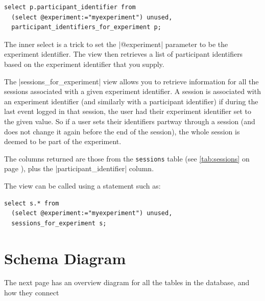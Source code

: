 \documentclass{report}
\newcommand{\myref}[1]{\autoref{#1} on page \pageref*{#1}}
\newcommand{\tabref}[1]{\lstinline|#1| table (see \myref{tab:#1})}
\begin{document}
\begin{lstlisting}
select p.participant_identifier from
  (select @experiment:="myexperiment") unused,
  participant_identifiers_for_experiment p;
\end{lstlisting}

The inner select is a trick to set the |@experiment| parameter to be the
experiment identifier.  The view then retrieves a list of participant
identifiers based on the experiment identifier that you supply.



The |sessions_for_experiment| view allows you to retrieve information for all
the sessions associated with a given experiment identifier.  A session is
associated with an experiment identifier (and similarly with a participant
identifier) if during the last event logged in that session, the user had
their experiment identifier set to the given value.  So if a user sets their
identifiers partway through a session (and does not change it again before the
end of the session), the whole session is deemed to be part of the experiment.

The columns returned are those from the \tabref{sessions}, plus the
|participant_identifier| column.

The view can be called using a statement such as:

\begin{lstlisting}
select s.* from
  (select @experiment:="myexperiment") unused,
  sessions_for_experiment s;
\end{lstlisting}




\section{Schema Diagram}

The next page has an overview diagram for all the tables in the database, and
how they connect
\end{document}
